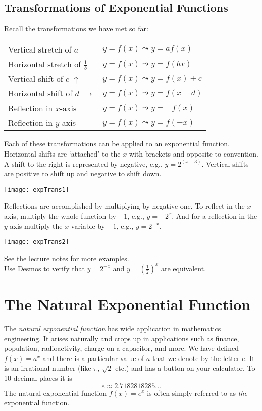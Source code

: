 \subsection*{Transformations of Exponential Functions}
Recall the transformations we have met so far:
\begin{center}{\renewcommand{\arraystretch}{1.3}
\begin{tabular}{ll}Vertical stretch of $a$  & $y =f (x) \leadsto y =a f (x)$  \\
	Horizontal stretch of $\frac{1}{b}$  & $y =f (x) \leadsto y =f (b x)$  \\
	Vertical shift of $c$ $\uparrow $  & $y =f (x) \leadsto y =f (x) +c$  \\
	Horizontal shift of $d$ $ \longrightarrow $  & $y =f (x) \leadsto y =f (x -d)$  \\
	Reflection in $x$-axis  & $y =f (x) \leadsto y = -f (x)$  \\
	Reflection in $y$-axis  & $y =f (x) \leadsto y =f ( -x)$
\end{tabular}}
\end{center}
Each of these transformations can be applied to an exponential function. Horizontal shifts are `attached' to the $x$ with brackets and opposite to convention. A shift to the right is represented by negative, e.g., $y=2^(x-3)$. Vertical shifts are positive to shift up and negative to shift down.
\begin{center}\texttt{[image: expTrans1]}\end{center}
Reflections are accomplished by multiplying by negative one. To reflect in the $x$-axis, multiply the whole function by $-1$, e.g., $y=-2^x$. And for a reflection in the $y$-axis multiply the $x$ variable by $-1$, e.g., $y=2^{-x}$.
\begin{center}\texttt{[image: expTrans2]}\end{center}
See the lecture notes for more examples.\\

\exercise Use Desmos to verify that $y =2^{-x}$ and $y =\left(\frac{1}{2}\right)^x$ are equivalent. 
\section[$e^x$]{The Natural Exponential Function}\label{sec:naturalExponential}
The \emph{natural exponential function} has wide application in mathematics engineering. It arises naturally and crops up in applications such as finance, population, radioactivity, charge on a capacitor, and more. We have defined $f (x) =a^x$ and there is a particular value of $a$ that we denote by the letter $e$. It is an irrational number (like $\pi $, $\sqrt{2}$ etc.) and has a button on your calculator. To 10 decimal places it is
\[e \approx 2.7182818285\dots\]
The natural exponential function $f (x) =e^x$ is often simply referred to as \textit{the} exponential function. 

